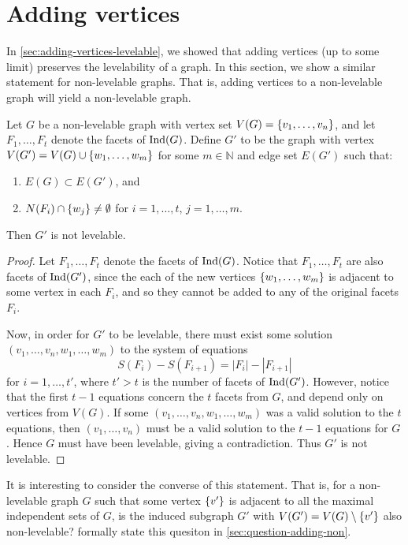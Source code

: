 \section{Adding vertices} \label{sec:adding-vertices-non-levelable}
In \autoref{sec:adding-vertices-levelable}, we showed that adding vertices (up to some limit) preserves the levelability of a graph. In this section, we show a similar statement for non-levelable graphs. That is, adding vertices to a non-levelable graph will yield a non-levelable graph.

\begin{theorem} \label{thm:adding-vertices-non-levelable}
Let $G$ be a non-levelable graph with vertex set $V(G) = \{ v_1, \dots, v_n \}$, and let $F_1, \dots, F_t$ denote the facets of $\textrm{Ind}(G)$. Define $G'$ to be the graph with vertex $V(G') = V(G) \cup \{ w_1, \dots, w_m \}$ for some $m \in \mathbb{N}$ and edge set $E(G')$ such that:
\begin{enumerate}
\item $E(G) \subset E(G')$, and 
\item $N(F_i) \cap \{ w_j \} \neq \emptyset$ for $i = 1, \dots, t$, $j = 1, \dots, m$.
\end{enumerate}
Then $G'$ is not levelable.
\end{theorem}

\begin{proof}
Let $F_1, \dots, F_t$ denote the facets of $\textrm{Ind} (G)$. Notice that $F_1, \dots, F_t$ are also facets of $\textrm{Ind} (G')$, since the each of the new vertices $\{ w_1, \dots, w_m \}$ is adjacent to some vertex in each $F_i$, and so they cannot be added to any of the original facets $F_i$. 

Now, in order for $G'$ to be levelable, there must exist some solution $(v_1, \dots, v_n, \allowbreak w_1, \dots, w_m)$ to the system of equations
$$
S(F_i) - S(F_{i+1}) = |F_i| - |F_{i+1}| 
$$
for $i = 1, \dots, t'$, where $t'>t$ is the number of facets of $\textrm{Ind} (G')$. However, notice that the first $t-1$ equations concern the $t$ facets from $G$, and depend only on vertices from $V(G)$. If some $(v_1, \dots, v_n, \allowbreak w_1, \dots, w_m)$ was a valid solution to the $t$ equations, then $(v_1, \dots, v_n)$ must be a valid solution to the $t-1$ equations for $G$. Hence $G$ must have been levelable, giving a contradiction. Thus $G'$ is not levelable. 
\end{proof}

It is interesting to consider the converse of this statement. That is, for a non-levelable graph $G$ such that some vertex $\{ v' \}$ is adjacent to all the maximal independent sets of $G$, is the induced subgraph $G'$ with $V(G') = V(G) \setminus \{ v' \}$ also non-levelable? formally state this quesiton in \autoref{sec:question-adding-non}.

